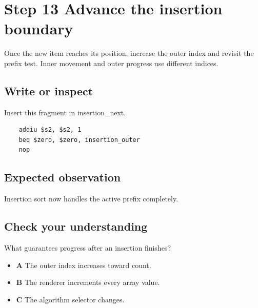 \section{Step 13 Advance the insertion
  boundary}\label{009-sorting-visualizer-s13-step-13-advance-the-insertion-boundary}

Once the new item reaches its position, increase the outer index and
revisit the prefix test. Inner movement and outer progress use different
indices.

\subsection{Write or
  inspect}\label{009-sorting-visualizer-s13-write-or-inspect}

Insert this fragment in insertion\_next.

\begin{verbatim}
    addiu $s2, $s2, 1
    beq $zero, $zero, insertion_outer
    nop
\end{verbatim}

\subsection{Expected
  observation}\label{009-sorting-visualizer-s13-expected-observation}

Insertion sort now handles the active prefix completely.

\subsection{Check your
  understanding}\label{009-sorting-visualizer-s13-check-your-understanding}

What guarantees progress after an insertion finishes?

\begin{itemize}
  \tightlist
  \item
        \textbf{A} The outer index increases toward count.
  \item
        \textbf{B} The renderer increments every array value.
  \item
        \textbf{C} The algorithm selector changes.
\end{itemize}
